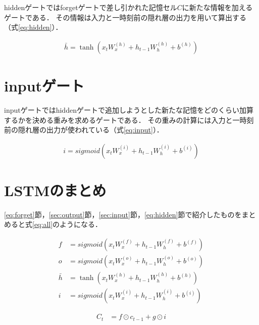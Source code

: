 \documentclass[a4j,11pt,report]{jsbook}
\begin{document}
hiddenゲートではforgetゲートで差し引かれた記憶セル$C$に新たな情報を加えるゲートである．
その情報は入力と一時刻前の隠れ層の出力を用いて算出する（式\ref{eq:hidden}）．


\begin{equation}
  \label{eq:hidden}
  \begin{split}
    \bar{h} = \tanh(x_{t}W_{x}^{(h)} + h_{t-1}W_{h}^{(h)} + b^{(h)})
  \end{split}
\end{equation}

\section{inputゲート\label{sec:input}}

inputゲートではhiddenゲートで追加しようとした新たな記憶をどのくらい加算するかを決める重みを求めるゲートである．
その重みの計算には入力と一時刻前の隠れ層の出力が使われている（式\ref{eq:input}）．


\begin{equation}
  \label{eq:input}
  \begin{split}
    i = sigmoid(x_{t}W_{x}^{(i)} + h_{t-1}W_{h}^{(i)} + b^{(i)})
  \end{split}
\end{equation}


\section{LSTMのまとめ}
\ref{eq:forget}節，\ref{sec:output}節，\ref{sec:input}節，\ref{eq:hidden}節で紹介したものをまとめると式\ref{eq:all}のようになる．


\begin{equation}
  \label{eq:all}
  \begin{split}
    f &= sigmoid(x_{t}W_{x}^{(f)} + h_{t-1}W_{h}^{(f)} + b^{(f)}) \\
    o &= sigmoid(x_{t}W_{x}^{(o)} + h_{t-1}W_{h}^{(o)} + b^{(o)}) \\
    \bar{h} &= \tanh(x_{t}W_{x}^{(h)} + h_{t-1}W_{h}^{(h)} + b^{(h)}) \\
    i &= sigmoid(x_{t}W_{x}^{(i)} + h_{t-1}W_{h}^{(i)} + b^{(i)})
  \end{split}
\end{equation}

\begin{equation}
  \label{eq:all2}
  \begin{split}
    C_{t} &= f \odot c_{t-1} + g \odot i
  \end{split}
\end{equation}
\end{document}
